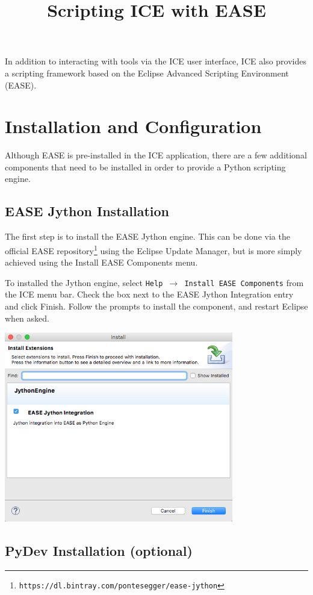 \documentclass{article}
\begin{document}
\title{Scripting ICE with EASE}

In addition to interacting with tools via the ICE user interface, ICE also
provides a scripting framework based on the Eclipse Advanced Scripting
Environment (EASE). 

\section{Installation and Configuration}

Although EASE is pre-installed in the ICE application, there are a few
additional components that need to be installed in order to provide a Python
scripting engine.

\subsection{EASE Jython Installation} 

The first step is to install the EASE Jython engine. This can be done via the
official EASE
repository\footnote{\texttt{https://dl.bintray.com/pontesegger/ease-jython}}
using the Eclipse Update Manager, but is more simply achieved using the Install EASE Components menu.

To installed the Jython engine, select \texttt{Help $\rightarrow$ Install
EASE Components} from the ICE menu bar. Check the box next to the EASE Jython
Integration entry and click Finish. Follow the prompts to install the component,
and restart Eclipse when asked.
\begin{center}
\includegraphics[width=10cm]{images/ease-marketplace}
\end{center}

\subsection{PyDev Installation (optional)} 
\end{document}
